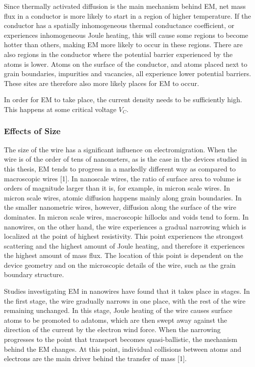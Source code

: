 Since thermally activated diffusion is the main mechanism behind EM, net mass flux in a conductor is more likely to start in a region of higher temperature. If the conductor has a spatially inhomogeneous thermal conductance coefficient, or experiences inhomogeneous Joule heating, this will cause some regions to become hotter than others, making EM more likely to occur in these regions. There are also regions in the conductor where the potential barrier experienced by the atoms is lower. Atoms on the surface of the conductor, and atoms placed next to grain boundaries, impurities and vacancies, all experience lower potential barriers. These sites are therefore also more likely places for EM to occur.

In order for EM to take place, the current density needs to be sufficiently high. This happens at some critical voltage $V_C$. 

\subsubsection{Effects of Size}
The size of the wire has a significant influence on electromigration. When the wire is of the order of tens of nanometers, as is the case in the devices studied in this thesis, EM tends to progress in a markedly different way as compared to macroscopic wires [1]. In nanoscale wires, the ratio of surface area to volume is orders of magnitude larger than it is, for example, in micron scale wires. In micron scale wires, atomic diffusion happens mainly along grain boundaries. In the smaller nanometric wires, however, diffusion along the surface of the wire dominates. In micron scale wires, macroscopic hillocks and voids tend to form. In nanowires, on the other hand, the wire experiences a gradual narrowing which is localized at the point of highest resistivity. This point experiences the strongest scattering and the highest amount of Joule heating, and therefore it experiences the highest amount of mass flux. The location of this point is dependent on the device geometry and on the microscopic details of the wire, such as the grain boundary structure. 

Studies investigating EM in nanowires have found that it takes place in stages. In the first stage, the wire gradually narrows in one place, with the rest of the wire remaining unchanged. In this stage, Joule heating of the wire causes surface atoms to be promoted to adatoms, which are then swept away against the direction of the current by the electron wind force. When the narrowing progresses to the point that transport becomes quasi-ballistic, the mechanism behind the EM changes. At this point, individual collisions between atoms and electrons are the main driver behind the transfer of mass [1]. 

